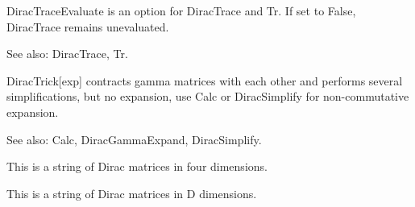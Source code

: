 







DiracTraceEvaluate is an option for DiracTrace and Tr. If set to False, DiracTrace remains unevaluated.

See also: DiracTrace, Tr.



DiracTrick[exp] contracts gamma matrices with each other and performs several simplifications, but no expansion, use Calc or
  DiracSimplify for non-commutative expansion.



See also:  Calc, DiracGammaExpand, DiracSimplify.


This is a string of Dirac matrices in four dimensions.




\dispSFoutmath{
-2\multsp {{\gamma }^{\nu }}
}

This is a string of Dirac matrices in D dimensions.



